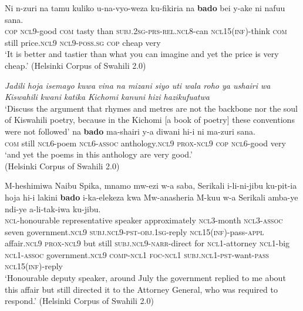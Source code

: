 \begin{exe}
	\ex\label{exAppendixSwahiliConcessive1}
	\gll Ni n-zuri na tamu kuliko u-na-vyo-weza ku-fikiria na \textbf{bado} bei y-ake ni nafuu sana.\\
	\textsc{cop} \textsc{ncl}9-good \textsc{com} tasty than \textsc{subj}.2\textsc{sg}-\textsc{prs}-\textsc{rel}.\textsc{ncl}8-can \textsc{ncl}15(\textsc{inf})-think \textsc{com} still price.\textsc{ncl}9 \textsc{ncl}9-\textsc{poss}.\textsc{sg} \textsc{cop} cheap very\\
	\glt \lq It is better and tastier than what you can imagine and yet the price is very cheap.’ (Helsinki Corpus of Swahili 2.0)
	
	\ex\label{exAppendixSwahiliConcessive2} 
	\textit{Jadili hoja isemayo kuwa vina na mizani siyo uti wala roho ya ushairi wa Kiswahili kwani katika Kichomi kanuni hizi hazikufuatwa}\\ 
	 \lq Discuss the argument that rhymes and metres are not the backbone nor the soul of Kiswahili poetry, because in the Kichomi [a book of poetry] these conventions were not followed'
	\exi{}
	\gll na \textbf{bado} ma-shairi y-a diwani hi-i ni ma-zuri sana.\\
	\textsc{com} still \textsc{ncl}6-poem \textsc{ncl}6-\textsc{assoc} anthology.\textsc{ncl}9 \textsc{prox}-\textsc{ncl}9 \textsc{cop} \textsc{ncl}6-good very\\
	\glt \lq and yet the poems in this anthology are very good.'
	\\(Helsinki Corpus of Swahili 2.0)
	
	\ex\label{exAppendixSwahiliConcessive3}	
	\gll M-heshimiwa Naibu Spika, mnamo mw-ezi w-a saba, Serikali i-li-ni-jibu ku-pit-ia hoja hi-i lakini \textbf{bado} i-ka-elekeza kwa Mw-anasheria M-kuu w-a Serikali amba-ye ndi-ye a-li-tak-iwa ku-jibu.\\
	\textsc{ncl}-honourable representative speaker approximately \textsc{ncl}3-month \textsc{ncl}3-\textsc{assoc} seven government.\textsc{ncl}9 \textsc{subj}.\textsc{ncl}9-\textsc{pst}-\textsc{obj}.1\textsc{sg}-reply \textsc{ncl}15(\textsc{inf})-pass-\textsc{appl} affair.\textsc{ncl}9 \textsc{prox}-\textsc{ncl}9 but still \textsc{subj}.\textsc{ncl}9-\textsc{narr}-direct for \textsc{ncl}1-attorney \textsc{ncl}1-big \textsc{ncl}1-\textsc{assoc} government.\textsc{ncl}9 \textsc{comp}-\textsc{ncl}1 \textsc{foc}-\textsc{ncl}1 \textsc{subj}.\textsc{ncl}1-\textsc{pst}-want-\textsc{pass} \textsc{ncl}15(\textsc{inf})-reply\\
	\glt \lq Honourable deputy speaker, around July the government replied to me about this affair but still directed it to the Attorney General, who was required to respond.' (Helsinki Corpus of Swahili 2.0)
\end{exe}




